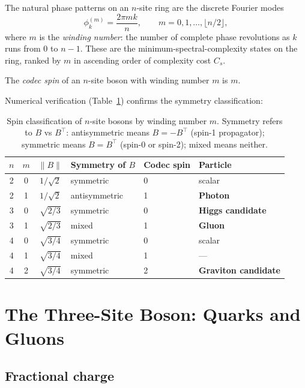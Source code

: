 \documentclass[11pt]{article}
\begin{document}
The natural phase patterns on an $n$-site ring are the discrete Fourier
modes
\[
  \phi_k^{(m)} = \frac{2\pi m k}{n}, \qquad m = 0, 1, \ldots, \lfloor n/2 \rfloor,
\]
where $m$ is the \emph{winding number}: the number of complete phase
revolutions as $k$ runs from $0$ to $n-1$.
These are the minimum-spectral-complexity states on the ring, ranked by
$m$ in ascending order of complexity cost $C_s$.

\begin{definition}
The \emph{codec spin} of an $n$-site boson with winding number $m$ is $m$.
\end{definition}

Numerical verification (Table~\ref{tab:spin}) confirms the symmetry
classification:

\begin{table}[h]
\centering
\begin{tabular}{ccclll}
\toprule
$n$ & $m$ & $\|B\|$ & Symmetry of $B$ & Codec spin & Particle \\
\midrule
2 & 0 & $1/\sqrt{2}$ & symmetric     & 0 & scalar   \\
2 & 1 & $1/\sqrt{2}$ & antisymmetric & 1 & \textbf{Photon} \\
3 & 0 & $\sqrt{2/3}$ & symmetric     & 0 & \textbf{Higgs candidate} \\
3 & 1 & $\sqrt{2/3}$ & mixed         & 1 & \textbf{Gluon} \\
4 & 0 & $\sqrt{3/4}$ & symmetric     & 0 & scalar   \\
4 & 1 & $\sqrt{3/4}$ & mixed         & 1 & ---      \\
4 & 2 & $\sqrt{3/4}$ & symmetric     & 2 & \textbf{Graviton candidate} \\
\bottomrule
\end{tabular}
\caption{Spin classification of $n$-site bosons by winding number $m$.
Symmetry refers to $B$ vs $B^\top$: antisymmetric means $B = -B^\top$
(spin-1 propagator); symmetric means $B = B^\top$ (spin-0 or spin-2);
mixed means neither.}
\label{tab:spin}
\end{table}

\section{The Three-Site Boson: Quarks and Gluons}
\label{sec:threesite}

\subsection{Fractional charge}
\end{document}

